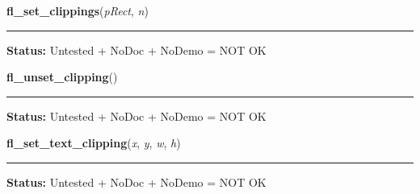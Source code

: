     \label{xformslib:library:fl_set_clippings}

    \vspace{0.5ex}

\hspace{.8\funcindent}\begin{boxedminipage}{\funcwidth}

    \raggedright \textbf{fl\_set\_clippings}(\textit{pRect}, \textit{n})

    \vspace{-1.5ex}

    \rule{\textwidth}{0.5\fboxrule}
\setlength{\parskip}{2ex}
\setlength{\parskip}{1ex}
\textbf{Status:} Untested + NoDoc + NoDemo = NOT OK



    \end{boxedminipage}

    \label{xformslib:library:fl_unset_clipping}

    \vspace{0.5ex}

\hspace{.8\funcindent}\begin{boxedminipage}{\funcwidth}

    \raggedright \textbf{fl\_unset\_clipping}()

    \vspace{-1.5ex}

    \rule{\textwidth}{0.5\fboxrule}
\setlength{\parskip}{2ex}
\setlength{\parskip}{1ex}
\textbf{Status:} Untested + NoDoc + NoDemo = NOT OK



    \end{boxedminipage}

    \label{xformslib:library:fl_set_text_clipping}

    \vspace{0.5ex}

\hspace{.8\funcindent}\begin{boxedminipage}{\funcwidth}

    \raggedright \textbf{fl\_set\_text\_clipping}(\textit{x}, \textit{y}, \textit{w}, \textit{h})

    \vspace{-1.5ex}

    \rule{\textwidth}{0.5\fboxrule}
\setlength{\parskip}{2ex}
\setlength{\parskip}{1ex}
\textbf{Status:} Untested + NoDoc + NoDemo = NOT OK



    \end{boxedminipage}

